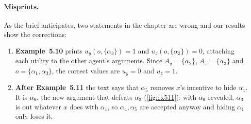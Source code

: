 \documentclass[11pt,a4paper]{article}
\theoremstyle{definition}
\begin{document}
\paragraph{Misprints.} As the brief anticipates, two statements in the chapter are wrong and our
results show the corrections:
\begin{enumerate}
  \item \textbf{Example~5.10} prints $u_y(o,\{\alpha_3\})=1$ and $u_z(o,\{\alpha_2\})=0$, attaching
        each utility to the other agent's arguments. Since $A_y=\{\alpha_2\}$, $A_z=\{\alpha_3\}$ and
        $o=\{\alpha_1,\alpha_3\}$, the correct values are $u_y=0$ and $u_z=1$.
  \item \textbf{After Example~5.11} the text says that $\alpha_5$ removes $x$'s incentive to hide
        $\alpha_1$. It is $\alpha_6$, the new argument that defeats $\alpha_3$
        (\cref{fig:ex511}): with $\alpha_6$ revealed, $\alpha_3$ is \textsf{out} whatever $x$ does
        with $\alpha_1$, so $\alpha_4,\alpha_5$ are accepted anyway and hiding $\alpha_1$ only loses
        it.
\end{enumerate}
\end{document}
